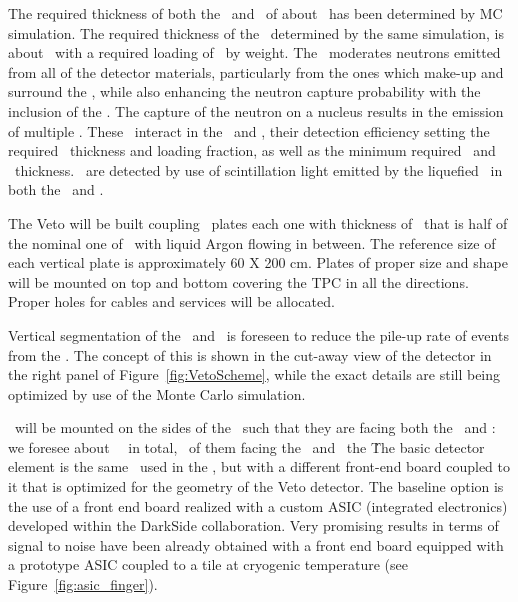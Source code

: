 The required thickness of both the \IAB\ and \OAB\ of about \DSkVetoOABThickness\ has been determined by MC simulation. The required thickness of the \GdAS\, determined by the same simulation,  is about \DSkVetoGdASThickness\ with a required  loading of \DSkVetoGdPercentage\ by weight.  The \GdAS\ moderates neutrons emitted from all of the detector materials, particularly from the ones which make-up and surround the \LArTPC, while also enhancing the neutron capture probability with the inclusion of the .  The capture of the neutron on a  nucleus results in the emission of multiple \grs.  These \grs\ interact in the \IAB\ and \OAB, their detection efficiency setting the required \GdAS\ thickness and  loading fraction, as well as the minimum required \IAB\ and \OAB\ thickness.  \grs\ are detected by use of scintillation light emitted by the liquefied \AAr\ in both the \IAB\ and \OAB. 

The Veto will be built coupling \GdAS\ plates each one with thickness of \DSkVetoGdAsSheetThickness\, that is half of the nominal one of \DSkVetoGdASThickness\, with liquid Argon flowing in between. The reference size of each vertical plate is approximately 60 X 200 cm. Plates of proper size and shape will be mounted on top and bottom covering the TPC in all the directions.
Proper holes for cables and services will be allocated.

Vertical segmentation of the \IAB\ and \OAB\ is foreseen to reduce the pile-up rate of  events from the \AAr.  The concept of this is shown in the cut-away view of the detector in the right panel of Figure~\ref{fig:VetoScheme}, while the exact details are still being optimized by use of the Monte Carlo simulation. 

\SiPMs\ will be mounted on the sides of the \GdAS\ such that they are facing both the \IAB\ and \OAB: we foresee about \DSkVetoTotalPDMs\ \SiPMs\ in total, \DSkVetoIABPDMs\ of them facing the \IAB\ and \DSkVetoOABPDMs\ the \OAB\. The basic detector element is the same \DSkPdm\ used in the \TPC, but with a different front-end board coupled to it that is optimized for the geometry of the Veto detector. 
The baseline option is the use of a front end board realized with a custom ASIC (integrated electronics) developed
within the DarkSide collaboration.
 Very promising results in terms of signal to noise have been already obtained with 
a front end board equipped with a prototype ASIC coupled to a tile at cryogenic temperature (see Figure~\ref{fig:asic_finger}).

